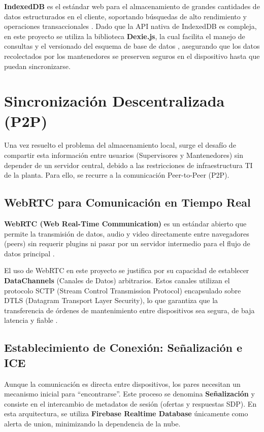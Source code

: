 \documentclass[10pt,a4paper]{report}
\begin{document}
\textbf{IndexedDB} es el estándar web para el almacenamiento de grandes cantidades de datos estructurados en el cliente, soportando búsquedas de alto rendimiento y operaciones transaccionales \cite{IndexedDB_W3C}. Dado que la API nativa de IndexedDB es compleja, en este proyecto se utiliza la biblioteca \textbf{Dexie.js}, la cual facilita el manejo de consultas y el versionado del esquema de base de datos \cite{DexieJS}, asegurando que los datos recolectados por los mantenedores se preserven seguros en el dispositivo hasta que puedan sincronizarse.

\section*{Sincronización Descentralizada (P2P)}
Una vez resuelto el problema del almacenamiento local, surge el desafío de compartir esta información entre usuarios (Supervisores y Mantenedores) sin depender de un servidor central, debido a las restricciones de infraestructura TI de la planta. Para ello, se recurre a la comunicación Peer-to-Peer (P2P).

\subsection*{WebRTC para Comunicación en Tiempo Real}
\textbf{WebRTC (Web Real-Time Communication)} es un estándar abierto que permite la transmisión de datos, audio y video directamente entre navegadores (peers) sin requerir plugins ni pasar por un servidor intermedio para el flujo de datos principal \cite{WebRTC_W3C}.

El uso de WebRTC en este proyecto se justifica por su capacidad de establecer \textbf{DataChannels} (Canales de Datos) arbitrarios. Estos canales utilizan el protocolo SCTP (Stream Control Transmission Protocol) encapsulado sobre DTLS (Datagram Transport Layer Security), lo que garantiza que la transferencia de órdenes de mantenimiento entre dispositivos sea segura, de baja latencia y fiable \cite{RFC8825}.

\subsection*{Establecimiento de Conexión: Señalización e ICE}
Aunque la comunicación es directa entre dispositivos, los pares necesitan un mecanismo inicial para ``encontrarse''. Este proceso se denomina \textbf{Señalización} y consiste en el intercambio de metadatos de sesión (ofertas y respuestas SDP). En esta arquitectura, se utiliza \textbf{Firebase Realtime Database} \cite{FirebaseDocs} únicamente como alerta de union, minimizando la dependencia de la nube.
\end{document}
